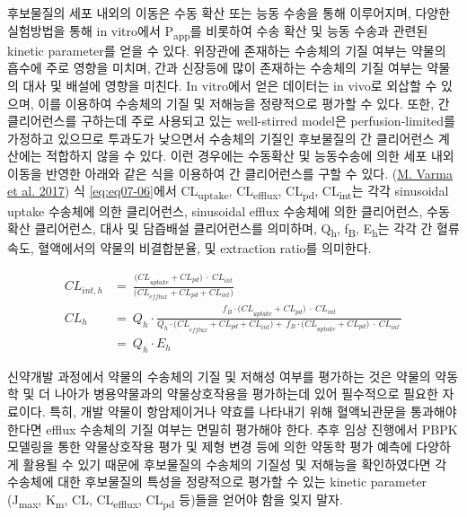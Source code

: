\documentclass[
  11pt,
  krantz2, a4paper, twoside]{krantz}
\begin{document}
후보물질의 세포 내외의 이동은 수동 확산 또는 능동 수송을 통해
이루어지며, 다양한 실험방법을 통해 in vitro에서 P\textsubscript{app}를 비롯하여 수송
확산 및 능동 수송과 관련된 kinetic parameter를 얻을 수 있다. 위장관에
존재하는 수송체의 기질 여부는 약물의 흡수에 주로 영향을 미치며, 간과
신장등에 많이 존재하는 수송체의 기질 여부는 약물의 대사 및 배설에 영향을
미친다. In vitro에서 얻은 데이터는 in vivo로 외삽할 수 있으며, 이를
이용하여 수송체의 기질 및 저해능을 정량적으로 평가할 수 있다. 또한, 간
클리어런스를 구하는데 주로 사용되고 있는 well-stirred model은
perfusion-limited를 가정하고 있으므로 투과도가 낮으면서 수송체의 기질인
후보물질의 간 클리어런스 계산에는 적합하지 않을 수 있다. 이런 경우에는
수동확산 및 능동수송에 의한 세포 내외 이동을 반영한 아래와 같은 식을
이용하여 간 클리어런스를 구할 수 있다. (\protect\hyperlink{ref-varma2017extended}{M. Varma et al. 2017}) 식
\eqref{eq:eq07-06}에서 CL\textsubscript{uptake}, CL\textsubscript{efflux}, CL\textsubscript{pd}, CL\textsubscript{int}는 각각
sinusoidal uptake 수송체에 의한 클리어런스, sinusoidal efflux 수송체에
의한 클리어런스, 수동확산 클리어런스, 대사 및 담즙배설 클리어런스를
의미하며, Q\textsubscript{h}, f\textsubscript{B}, E\textsubscript{h}는 각각 간 혈류 속도, 혈액에서의 약물의
비결합분율, 및 extraction ratio를 의미한다.

\begin{equation}
\begin{split}
{CL}_{int,h} &= \ \frac{{(CL}_{uptake} + {CL}_{pd})\  \cdot \ {CL}_{int}}{{(CL}_{efflux} + {CL}_{pd} + {CL}_{int})} \\
{CL}_{h} &= \ Q_{h} \cdot \frac{f_{B} \cdot {(CL}_{uptake} + {CL}_{pd})\  \cdot \ {CL}_{int}}{{Q_{h} \cdot (CL}_{efflux} + {CL}_{pd} + {CL}_{int}) + \ f_{B} \cdot {(CL}_{uptake} + {CL}_{pd})\  \cdot \ {CL}_{int}\ } \\ 
&= \ Q_{h} \cdot E_{h}
\end{split}
\label{eq:eq07-06} 
\end{equation}

신약개발 과정에서 약물의 수송체의 기질 및 저해성 여부를 평가하는 것은
약물의 약동학 및 더 나아가 병용약물과의 약물상호작용을 평가하는데 있어
필수적으로 필요한 자료이다. 특히, 개발 약물이 항암제이거나 약효를
나타내기 위해 혈액뇌관문을 통과해야 한다면 efflux 수송체의 기질 여부는
면밀히 평가해야 한다. 추후 임상 진행에서 PBPK 모델링을 통한 약물상호작용
평가 및 제형 변경 등에 의한 약동학 평가 예측에 다양하게 활용될 수 있기
때문에 후보물질의 수송체의 기질성 및 저해능을 확인하였다면 각 수송체에
대한 후보물질의 특성을 정량적으로 평가할 수 있는 kinetic parameter
(J\textsubscript{max}, K\textsubscript{m}, CL, CL\textsubscript{efflux}, CL\textsubscript{pd} 등)들을 얻어야 함을 잊지 말자.
\end{document}

